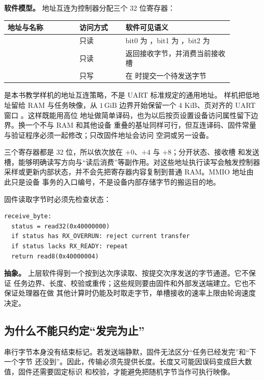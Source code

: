\textbf{软件模型。} 地址互连为控制器分配三个 32 位寄存器：

\begin{longtable}{|L{0.28\linewidth}|L{0.18\linewidth}|L{0.42\linewidth}|}
\hline
{}
地址与名称 & 访问方式 & 软件可见语义 \\ \hline
{} & 只读 & bit0 为 ，bit1 为
，bit2 为  \\ \hline
{} & 只读 & 返回接收字节，并消费当前接收槽 \\ \hline
{} & 只写 & 在  时提交一个待发送字节 \\ \hline
\end{longtable}

 是本书教学样机的地址互连策略，不是 UART 标准规定的通用地址。
样机把低地址留给 RAM 与任务映像，从 \(1\,\mathrm{GiB}\) 边界开始保留一个
4 KiB、页对齐的 UART 窗口 \code{[0x40000000, 0x40001000)}。这样既能用高位
地址做简单译码，也为以后按页设置设备访问属性留下边界。换一个不与 RAM 和其他设备
重叠的基址同样可行，但互连译码、固件常量与验证程序必须一起修改；只改固件地址会访问
空洞或另一设备。

三个寄存器都是 32 位，所以依次放在 \(+0\)、\(+4\) 与 \(+8\)；分开状态、接收槽
和发送槽，能够明确读写方向与“读后消费”等副作用。对这些地址执行读写会触发控制器
采样或更新内部状态，并不会先把寄存器内容复制到普通 RAM。MMIO 地址由此只是设备
事务的入口编号，不是设备内部存储字节的搬运目的地。

固件读取字节时必须先检查状态：

\begin{lstlisting}
receive_byte:
  status = read32(0x40000000)
  if status has RX_OVERRUN: reject current transfer
  if status lacks RX_READY: repeat
  return read8(0x40000004)
\end{lstlisting}

\textbf{抽象。} 上层软件得到一个按到达次序读取、按提交次序发送的字节通道。它不保证
任务边界、长度、校验或重传；这些规则要由固件和外部发送端建立。它也不保证处理器在做
其他计算时仍能及时取走字节，单槽接收的速率上限由轮询速度决定。

\subsection{为什么不能只约定“发完为止”}

串行字节本身没有结束标记。若发送端静默，固件无法区分“任务已经发完”和“下一个字节
还没到”。因此，传输必须先提供长度。长度又可能因误码变成巨大数值，固件还需要固定标识
和校验，才能避免把随机字节当作可执行映像。

